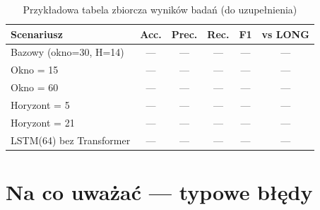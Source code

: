 \documentclass[12pt,a4paper]{report}
\begin{document}
\begin{table}[H]

\centering

\caption{Przykładowa tabela zbiorcza wyników badań (do uzupełnienia)}

\label{tab:zbiorcza}

\begin{tabular}{@{}lccccc@{}}

\toprule

\textbf{Scenariusz} & \textbf{Acc.} & \textbf{Prec.} & \textbf{Rec.} & \textbf{F1} & \textbf{vs LONG} \\

\midrule

Bazowy (okno=30, H=14)       & --- & --- & --- & --- & --- \\

Okno = 15                    & --- & --- & --- & --- & --- \\

Okno = 60                    & --- & --- & --- & --- & --- \\

Horyzont = 5                 & --- & --- & --- & --- & --- \\

Horyzont = 21                & --- & --- & --- & --- & --- \\

LSTM(64) bez Transformer     & --- & --- & --- & --- & --- \\

\bottomrule

\end{tabular}

\end{table}



\section{Na co uważać --- typowe błędy}
\end{document}
